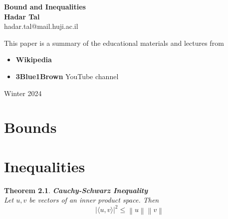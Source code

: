 \documentclass[11pt]{book} %
\newtheorem{theorem}{Theorem}[section]
\begin{document}
\begin{titlepage}
    \begin{center}
     {\huge\bfseries 
    Bound and Inequalities     \\}
     \vspace{1.5cm}
     {\Large\bfseries Hadar Tal}\\[5pt]
     hadar.tal@mail.huji.ac.il\\[14pt]
     \vspace{2cm}
     {This paper is a summary of the educational materials and lectures from 
     \begin{itemize}
        \item \textbf{Wikipedia}
        \item \textbf{3Blue1Brown} YouTube channel
     \end{itemize}
     }

     \vfill
    {Winter 2024}
    \end{center}
\end{titlepage}


\frontmatter
\tableofcontents


\mainmatter

\chapter{Bounds}

\chapter{Inequalities}

\begin{theorem}{\textbf{Cauchy-Schwarz Inequality}} \\
    Let $u, v$ be vectors of an inner product space. Then
    \begin{equation*}
        \left| \langle u, v \rangle \right|^2 \leq \left\| u \right\| \left\| v \right\|
    \end{equation*}
\end{theorem} 
\end{document}
